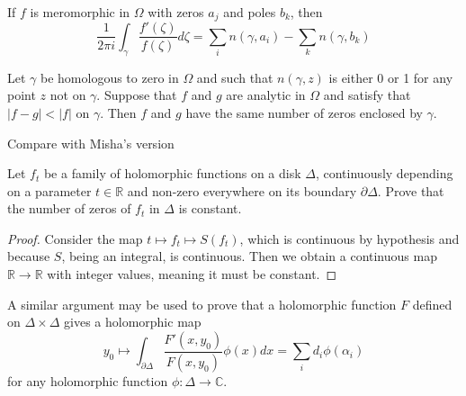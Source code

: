 \begin{theorem}
\label{theorem-argument-principle-and-Rouche-theorem}
\begin{reference}
\cite[Chapter 5, Theorem 18]{ahl}
\end{reference}
If $f$ is meromorphic in $\Omega$ with zeros $a_j$ and poles $b_k$, then
\begin{equation}
\label{equation-argument-principle}
\frac{1}{2\pi i}\int_\gamma\frac{f'(\zeta)}{f(\zeta)}d\zeta
=\sum_{i}n(\gamma,a_i)-\sum_{k}n(\gamma,b_k)
\end{equation}
\end{theorem}

\begin{lemma}
\label{lemma-Rouche-theorem}
\begin{reference}
\cite[Chapter 5, Corollary, p. 153]{ahl}
\end{reference}
Let $\gamma$ be homologous to zero in $\Omega$ and such that $n(\gamma,z)$ is
either 0 or 1 for any point $z$ not on $\gamma$. Suppose that $f$ and $g$ are
analytic in $\Omega$ and satisfy that $|f-g|<|f|$ on $\gamma$. Then $f$ and $g$
have the same number of zeros enclosed by $\gamma$.
\end{lemma}

Compare with Misha's version

\begin{theorem}
\label{theorem-Rouche-theorem-Mishas-version}
Let $f_t$ be a family of holomorphic functions on a disk  $\Delta$, continuously
depending on a parameter $t\in \mathbb{R}$ and non-zero everywhere on its
boundary $\partial\Delta$. Prove that the number of zeros of $f_t$ in $\Delta$
is constant.
\end{theorem}

\begin{proof}
Consider the map $t\mapsto f_t\mapsto S(f_t)$, which is continuous by hypothesis
and because $S$, being an integral, is continuous. Then we obtain a continuous
map $\mathbb{R}\to\mathbb{R}$ with integer values, meaning it must be constant.
\end{proof}

A similar argument may be used to prove that a holomorphic function $F$ defined
on $\Delta\times\Delta$ gives a holomorphic map 
\begin{equation}
\label{equation-zeros-on-polydisk}
y_0\mapsto \int_{\partial\Delta}\frac{F'(x,y_0)}{F(x,y_0)}\phi(x)dx
=\sum_id_i\phi(\alpha_i)
\end{equation}
for any holomorphic function $\phi:\Delta\to\mathbb{C}$.

